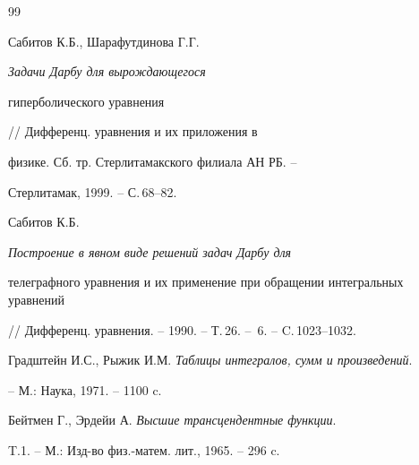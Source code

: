 \begin{thebibliography}{99}


Сабитов К.Б., Шарафутдинова Г.Г. {\em Задачи Дарбу для вырождающегося 


гиперболического уравнения} // Дифференц. уравнения и их приложения в 


физике. Сб. тр. Стерлитамакского филиала АН РБ. --  


Стерлитамак, 1999. -- С.\,68--82.    




Сабитов К.Б. {\em Построение в явном виде решений задач Дарбу для 


телеграфного уравнения и их применение при обращении интегральных уравнений} 


// Дифференц. уравнения. -- 1990. -- Т.\,26. -- \No\,6. -- C.\,1023--1032.




Градштейн И.С., Рыжик И.М. {\em Таблицы интегралов, сумм и произведений}.


-- М.: Наука, 1971. -- 1100 c.




Бейтмен Г., Эрдейи А. {\em Высшие трансцендентные функции}. 


T.1. -- М.: Изд-во физ.-матем. лит., 1965. -- 296 c.





\end{thebibliography}





\vskip 2cm









\smallskip









\label{end}





